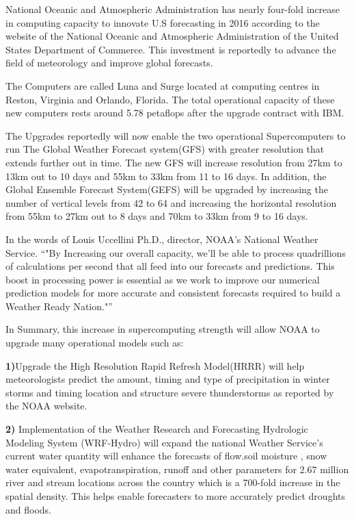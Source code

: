 \documentclass[fleqn,letterpaper,12pt]{report}
\begin{document}
%
\newpage
{}
{}
\problem
National Oceanic and Atmospheric Administration has nearly four-fold increase in computing capacity to innovate U.S forecasting in 2016 according to the website of the National Oceanic and Atmospheric Administration of the United States Department of Commerce. This investment is reportedly to advance the field of meteorology and improve global forecasts.

The Computers are called Luna and Surge located at computing centres in Reston, Virginia and Orlando, Florida. The total operational capacity of these new computers rests around 5.78 petaflops after the upgrade contract with IBM.\cite{latest}

The Upgrades reportedly will now enable the two operational Supercomputers to run The Global Weather Forecast system(GFS) with greater resolution that extends further out in time. The new GFS will increase resolution from 27km to 13km out to 10 days and 55km to 33km from 11 to 16 days. In addition, the Global Ensemble Forecast System(GEFS) will be upgraded by increasing the number of vertical levels from 42 to 64 and increasing the horizontal resolution from 55km to 27km out to 8 days and 70km to 33km from 9 to 16 days. 


In the words of Louis Uccellini Ph.D., director, NOAA’s National Weather Service. “"By Increasing our overall capacity, we’ll be able to process quadrillions of calculations per second that all feed into our forecasts and predictions. This boost in processing power is essential as we work to improve our numerical prediction models for more accurate and consistent forecasts required to build a Weather Ready Nation."”\cite{NOAA}

In Summary, this increase in supercomputing strength will allow NOAA to upgrade many operational models such as:

\textbf{1)}Upgrade the High Resolution Rapid Refresh Model(HRRR) will help meteorologists predict the amount, timing and type of precipitation in winter storms and timing location and structure severe thunderstorms as reported by the NOAA website.

\textbf{2)} Implementation of the Weather Research and Forecasting Hydrologic Modeling System (WRF-Hydro) will expand the national Weather Service’s current water quantity will enhance the forecasts of flow.soil moisture , snow water equivalent, evapotranspiration, runoff and other parameters for 2.67 million river and stream locations across the country which is a 700-fold increase in the spatial density. This helps enable forecasters to more accurately predict droughts and floods.
\end{document}
